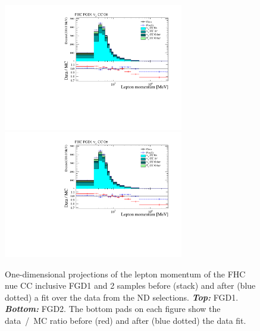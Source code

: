 \begin{figure}[ht]
  \center
  \includegraphics[keepaspectratio=true,width=0.7\textwidth,page=19]{images/BANFF/reactionCodeStacks_PrefitAndPostfit_mom.pdf}\\
  \includegraphics[keepaspectratio=true,width=0.7\textwidth,page=20]{images/BANFF/reactionCodeStacks_PrefitAndPostfit_mom.pdf}\\
  \begin{center}
    \caption[FHC $\nu_e$ CC FGD1 and 2 samples before and after a fit
    over the data from the ND280 selections]{One-dimensional
      projections of the lepton momentum of the \Gls{FHC} \Gls{nue}
      \Gls{CC} inclusive \Gls{FGD}1 and 2 samples before (stack) and
      after (blue dotted) a fit over the data from the \Gls{ND}
      selections. \textbf{\textit{Top:}}
      \Gls{FGD}1. \textbf{\textit{Bottom:}} \Gls{FGD}2. The bottom
      pads on each figure show the data~/~\Gls{MC} ratio before (red)
      and after (blue dotted) the data fit.}
    \label{fig:nue}
  \end{center}
\end{figure}

